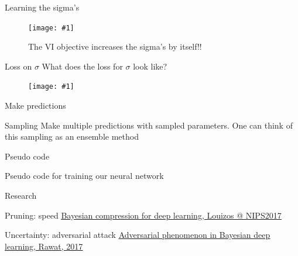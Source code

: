 \documentclass{beamer}
\newcommand{\fitfigure}[1]{\centering\texttt{[image: \#1]}}
\newcommand{\mdlink}[2]{\href{#2}{\underline{#1}}}
\begin{document}
\begin{frame}{Learning the sigma's}
	\begin{figure}
		\fitfigure{/home/rob/Dropbox/ml_projects/weight_uncertainty/weight_uncertainty/im/tensorboard_sample_sigma_pruning.png}
		\caption{The VI objective increases the sigma's by itself!!}
	\end{figure}
		
\end{frame}

\begin{frame}{Loss on $\sigma$}
	What does the loss for $\sigma$ look like?
	\begin{figure}
		\fitfigure{/home/rob/Dropbox/ml_projects/weight_uncertainty/weight_uncertainty/im/loss_sigma.png}
	\end{figure}
\end{frame}

\begin{frame}{Make predictions}
	\begin{block}{Sampling}
		Make multiple predictions with sampled parameters. 
		One can think of this sampling as an ensemble method
	\end{block}   
	
\end{frame}


\begin{frame}[shrink=30]{Pseudo code}
	\centerline{Pseudo code for training our neural network}
	
\end{frame}

\begin{frame}[shrink=10]
	
\end{frame}

\begin{frame}{Research}
	\begin{block}{Pruning: speed}
		\mdlink{Bayesian compression for deep learning, Louizos @ NIPS2017}{http://papers.nips.cc/paper/6921-bayesian-compression-for-deep-learning.pdf}
	\end{block}
		
	\begin{block}{Uncertainty: adversarial attack}
		\mdlink{Adversarial phenomenon in Bayesian deep learning, Rawat, 2017}{https://arxiv.org/pdf/1711.08244.pdf}
	\end{block}
\end{frame}
\end{document}
